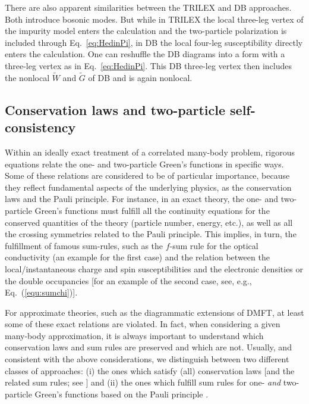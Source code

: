 \documentclass[rmp,aps,reprint,amsmath,amssymb,superscriptaddress,showpacs,nofootinbib]{revtex4-1}
\begin{document}
There are also apparent similarities between the TRILEX and DB approaches. Both introduce bosonic modes. But while in  TRILEX the local three-leg vertex of the impurity model enters the calculation and the two-particle polarization is  included through Eq.~\eqref{eq:HedinPi}, in DB the local four-leg susceptibility directly enters the calculation. One can reshuffle the DB diagrams into a form with a three-leg vertex as in  Eq.~\eqref{eq:HedinPi}. This DB three-leg vertex then includes the nonlocal $\widetilde{W}$ and  $\widetilde{G}$ of DB and  is again nonlocal.

\subsection{Conservation laws and two-particle self-consistency}
\label{sec:conservation}

Within an ideally exact treatment of a correlated many-body problem, rigorous equations relate the one- and two-particle Green's functions in specific ways. Some of these relations are considered to be of particular importance, because they reflect fundamental aspects of the underlying physics, as the conservation laws and the Pauli principle. For instance, in an exact theory, the one- and two-particle Green's  functions must fulfill all the continuity equations for the conserved quantities of the theory  (particle number, energy, etc.), as well as all the crossing symmetries related to the Pauli principle. This implies, in turn, the fulfillment of famous sum-rules, such as the $f$-sum rule for the optical conductivity (an example for the first case) and the relation between the local/instantaneous charge and spin susceptibilities and the electronic densities or the double occupancies [for an example of the second case, see, e.g., Eq.~(\ref{equ:sumchi})]. 

For approximate theories, such as the diagrammatic extensions of DMFT, at least some of these exact relations are violated. In fact, when considering a given many-body approximation, it is always important to understand which  conservation laws and sum rules are preserved and which are not. Usually, and consistent with the above considerations, we distinguish between two different classes of approaches: (i) the ones which satisfy (all) conservation laws [and the related sum rules; see ] and (ii) the ones which fulfill sum rules for one- {\sl and} two-particle Green's functions based on the Pauli principle \cite{Vilk1997}. 
\end{document}
